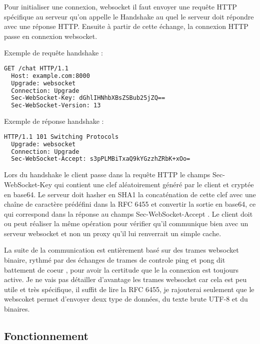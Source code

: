 Pour initialiser une connexion, websocket il faut envoyer une requête HTTP spécifique au serveur qu'on appelle le \og Handshake \fg{} au quel le serveur doit répondre avec une réponse HTTP. Ensuite à partir de cette échange, la connexion HTTP passe en connexion websocket.

\noindent Exemple de requête handshake :
\begin{lstlisting}[language=bash]
  GET /chat HTTP/1.1
  Host: example.com:8000
  Upgrade: websocket
  Connection: Upgrade
  Sec-WebSocket-Key: dGhlIHNhbXBsZSBub25jZQ==
  Sec-WebSocket-Version: 13
\end{lstlisting}

\noindent Exemple de réponse handshake :
\begin{lstlisting}[language=bash]
  HTTP/1.1 101 Switching Protocols
  Upgrade: websocket
  Connection: Upgrade
  Sec-WebSocket-Accept: s3pPLMBiTxaQ9kYGzzhZRbK+xOo=
\end{lstlisting}

Lors du handshake le client passe dans la requête HTTP le champs \og Sec-WebSocket-Key \fg{} qui contient une clef aléatoirement généré par le client et cryptée en base64. Le serveur doit hasher en SHA1 la concaténation de cette clef avec une chaîne de caractère prédéfini dans la RFC 6455 et convertir la sortie en base64, ce qui correspond dans la réponse au champs \og Sec-WebSocket-Accept \fg{}. Le client doit ou peut réaliser la même opération pour vérifier qu'il communique bien avec un serveur websocket et non un proxy qu'il lui renverrait un simple cache.

La suite de la communication est entièrement basé sur des trames websocket binaire, rythmé par des échanges de trames de controle ping et pong dit \og battement de coeur \fg{}, pour avoir la certitude que le la connexion est toujours active. Je ne vais pas détailler d'avantage les trames websocket car cela est peu utile et très spécifique, il suffit de lire la RFC 6455, je rajouterai seulement que le webscoket permet d'envoyer deux type de données, du texte brute UTF-8 et du binaires.

\subsection{Fonctionnement}

